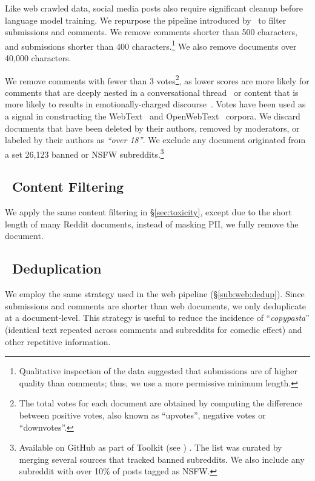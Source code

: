 Like web crawled data, social media posts also require significant cleanup before language model training. 
We repurpose the pipeline introduced by~\citet{Henderson2019} to filter submissions and comments.
We remove comments shorter than 500 characters, and submissions shorter than 400 characters.\footnote{Qualitative inspection of the data suggested that submissions are of higher quality than comments; thus, we use a more permissive minimum length.}
We also remove documents over 40,000 characters. 

We remove comments with fewer than 3 votes\footnote{The total votes for each document are obtained by computing the difference between positive votes, also known as ``upvotes'', negative votes or ``downvotes''.}, as lower scores are more likely for comments that are deeply nested in a conversational thread~\citep{Weninger2013-kz} or content that is more likely to results in emotionally-charged discourse~\citep{Davis2021-rg}.
Votes have been used as a signal in constructing the WebText~\citep{Radford2019-vq} and OpenWebText~\citep{PetersonUnknown-dv} corpora.
We discard documents that have been deleted by their authors, removed by moderators, or labeled by their authors as \textit{``over 18''}.
We exclude any document originated from a set 26,123 banned or NSFW subreddits.\footnote{Available on GitHub as part of \dolma Toolkit (see \href{https://github.com/allenai/dolma/blob/a9eaf294b677af4e724dfc39014014fd3af0627f/sources/reddit/atomic_content_v5/subreddit_blocklist.txt}{})
. The list was curated by merging several sources that tracked banned subreddits. We also include any subreddit with over 10\% of posts tagged as NSFW.}

\subsection{\toolkitFilter~Content Filtering} 

We apply the same content filtering in \S\ref{sec:toxicity}, except due to the short length of many Reddit documents, instead of masking PII, we fully remove the document. 

    


\subsection{\toolkitDedupe~Deduplication} 


We employ the same strategy used in the web pipeline (\S\ref{sub:web:dedup}). 
Since submissions and comments are shorter than web documents, we only deduplicate at a document-level. 
This strategy is useful to reduce the incidence of ``\textit{copypasta}'' (identical text repeated across comments and subreddits for comedic effect) and other repetitive information. 





